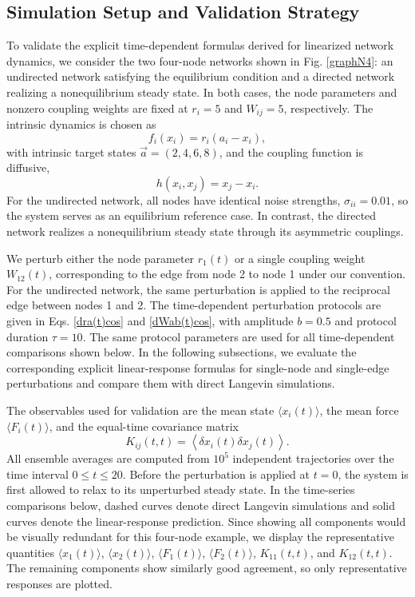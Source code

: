 \subsection{Simulation Setup and Validation Strategy}
To validate the explicit time-dependent formulas derived for linearized network dynamics, we consider the two four-node networks shown in Fig. \ref{graphN4}: an undirected network satisfying the equilibrium condition and a directed network realizing a nonequilibrium steady state. In both cases, the node parameters and nonzero coupling weights are fixed at $r_i=5$ and $W_{ij}=5$, respectively. The intrinsic dynamics is chosen as
\begin{equation}
    f_i(x_i)=r_i(a_i-x_i),
\end{equation}
with intrinsic target states $\vec{a}=(2,4,6,8)$, and the coupling function is diffusive,
\begin{equation}
    h(x_i,x_j)=x_j-x_i .
\end{equation}
For the undirected network, all nodes have identical noise strengths, $\sigma_{ii}=0.01$, so the system serves as an equilibrium reference case. In contrast, the directed network realizes a nonequilibrium steady state through its asymmetric couplings.\par
We perturb either the node parameter $r_1(t)$ or a single coupling weight $W_{12}(t)$, corresponding to the edge from node 2 to node 1 under our convention. For the undirected network, the same perturbation is applied to the reciprocal edge between nodes 1 and 2. The time-dependent perturbation protocols are given in Eqs. \eqref{dra(t)cos} and \eqref{dWab(t)cos}, with amplitude $b=0.5$ and protocol duration $\tau=10$. The same protocol parameters are used for all time-dependent comparisons shown below. In the following subsections, we evaluate the corresponding explicit linear-response formulas for single-node and single-edge perturbations and compare them with direct Langevin simulations.

The observables used for validation are the mean state $\langle x_i(t)\rangle$, 
the mean force $\langle F_i(t)\rangle$, and the equal-time covariance matrix
\begin{equation}
    K_{ij}(t,t) = \left\langle \delta x_i(t)\delta x_j(t)\right\rangle .
\end{equation}
All ensemble averages are computed from $10^5$ independent trajectories over the time interval $0\leq t\leq 20$. Before the perturbation is applied at $t=0$, the system is first allowed to relax to its unperturbed steady state. In the time-series comparisons below, dashed curves denote direct Langevin simulations and solid curves denote the linear-response prediction. Since showing all components would be visually redundant for this four-node example, we display the representative quantities $\langle x_1(t)\rangle$, $\langle x_2(t)\rangle$, $\langle F_1(t)\rangle$, $\langle F_2(t)\rangle$, $K_{11}(t,t)$, and $K_{12}(t,t)$. The remaining components show similarly good agreement, so only representative responses are plotted.

